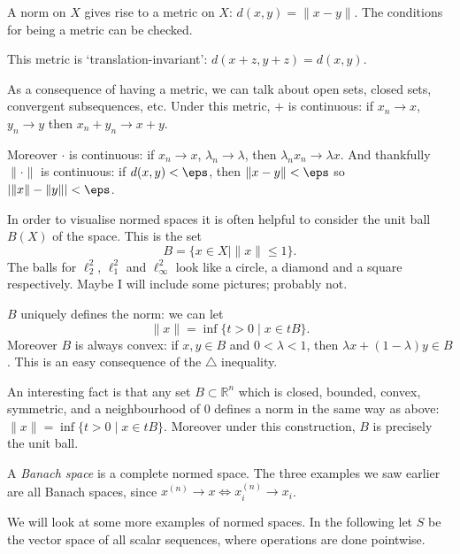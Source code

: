 \documentclass[12pt]{article}
\begin{document}
A norm on $X$ gives rise to a metric on $X$: $d(x, y) = \|x-y\|$. The conditions for being a metric can be checked.

This metric is `translation-invariant': $d(x+z,y+z) = d(x, y)$.

As a consequence of having a metric, we can talk about open sets, closed sets, convergent subsequences, etc. Under this metric, $+$ is continuous:  if $x_n \to x$, $y_n \to y$ then $x_n + y_n \to x + y$. 

Moreover $\cdot$ is continuous: if $x_n \to x$, $\lambda_n \to \lambda$, then $\lambda_n x_n \to \lambda x$. And thankfully $\|\cdot\|$ is continuous: if $d(x, y) < \eps$, then $\|x-y\|<\eps$ so $| \|x\| - \|y\| | < \eps$.

In order to visualise normed spaces it is often helpful to consider the unit ball $B(X)$ of the space. This is the set
\[
	B = \{x \in X \mid \|x\| \le 1\}.
\]
The balls for $\ell_2^2$, $\ell_1^2$ and $\ell_\infty^2$ look like a circle, a diamond and a square respectively. Maybe I will include some pictures; probably not.

$B$ uniquely defines the norm: we can let
\[
	\|x\| = \inf \{t > 0 \mid x \in tB\}.
\]
Moreover $B$ is always convex: if $x, y \in B$ and $0 < \lambda < 1$, then $\lambda x + (1-\lambda) y \in B$. This is an easy consequence of the $\triangle$ inequality.

An interesting fact is that any set $B \subset \mathbb{R}^{n}$ which is closed, bounded, convex, symmetric, and a neighbourhood of 0 defines a norm in the same way as above: $\|x\| = \inf \{t > 0 \mid x \in t B\}$. Moreover under this construction, $B$ is precisely the unit ball.

A \emph{Banach space} is a complete normed space. The three examples we saw earlier are all Banach spaces, since $x^{(n)} \to x \iff x_i^{(n)} \to x_i$.

We will look at some more examples of normed spaces. In the following let $S$ be the vector space of all scalar sequences, where operations are done pointwise.
\end{document}
